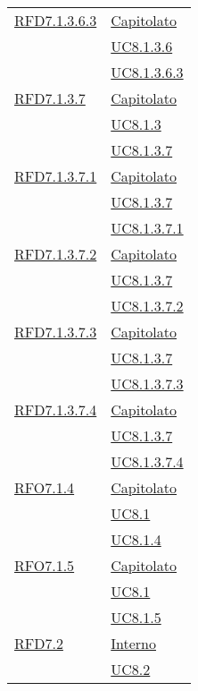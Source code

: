 \begin{longtable}{|>{\centering}m{5cm}|m{5cm}<{\centering}|}
\hyperlink{RFD7.1.3.6.3}{RFD7.1.3.6.3} & \hyperlink{Capitolato}{Capitolato}\\
& \hyperref[UC8.1.3.6]{UC8.1.3.6}\\
& \hyperref[UC8.1.3.6.3]{UC8.1.3.6.3}\\ \hline

\hyperlink{RFD7.1.3.7}{RFD7.1.3.7} & \hyperlink{Capitolato}{Capitolato}\\
& \hyperref[UC8.1.3]{UC8.1.3}\\
& \hyperref[UC8.1.3.7]{UC8.1.3.7}\\ \hline

\hyperlink{RFD7.1.3.7.1}{RFD7.1.3.7.1} & \hyperlink{Capitolato}{Capitolato}\\
& \hyperref[UC8.1.3.7]{UC8.1.3.7}\\
& \hyperref[UC8.1.3.7.1]{UC8.1.3.7.1}\\ \hline

\hyperlink{RFD7.1.3.7.2}{RFD7.1.3.7.2} & \hyperlink{Capitolato}{Capitolato}\\
& \hyperref[UC8.1.3.7]{UC8.1.3.7}\\
& \hyperref[UC8.1.3.7.2]{UC8.1.3.7.2}\\ \hline

\hyperlink{RFD7.1.3.7.3}{RFD7.1.3.7.3} & \hyperlink{Capitolato}{Capitolato}\\
& \hyperref[UC8.1.3.7]{UC8.1.3.7}\\
& \hyperref[UC8.1.3.7.3]{UC8.1.3.7.3}\\ \hline

\hyperlink{RFD7.1.3.7.4}{RFD7.1.3.7.4} & \hyperlink{Capitolato}{Capitolato}\\
& \hyperref[UC8.1.3.7]{UC8.1.3.7}\\
& \hyperref[UC8.1.3.7.4]{UC8.1.3.7.4}\\ \hline

\hyperlink{RFO7.1.4}{RFO7.1.4} & \hyperlink{Capitolato}{Capitolato}\\
& \hyperref[UC8.1]{UC8.1}\\
& \hyperref[UC8.1.4]{UC8.1.4}\\ \hline

\hyperlink{RFO7.1.5}{RFO7.1.5} & \hyperlink{Capitolato}{Capitolato}\\
& \hyperref[UC8.1]{UC8.1}\\
& \hyperref[UC8.1.5]{UC8.1.5}\\ \hline

\hyperlink{RFD7.2}{RFD7.2} & \hyperlink{Interno}{Interno}\\
& \hyperref[UC8.2]{UC8.2}\\ \hline


\end{longtable}
